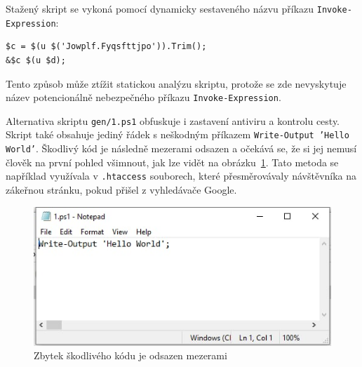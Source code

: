 \documentclass[12pt,a4paper]{article}
\begin{document}
Stažený skript se vykoná pomocí dynamicky sestaveného názvu příkazu \texttt{Invoke-Expression}:
\begin{verbatim}
$c = $(u $('Jowplf.Fyqsfttjpo')).Trim();
&$c $(u $d);
\end{verbatim}
Tento způsob může ztížit statickou analýzu skriptu, protože se zde nevyskytuje název potencionálně nebezpečného příkazu \texttt{Invoke-Expression}.


Alternativa skriptu \texttt{gen/1.ps1} obfuskuje i zastavení antiviru a kontrolu cesty.
Skript také obsahuje jediný řádek s neškodným příkazem \texttt{Write-Output 'Hello World'}.
Škodlivý kód je následně mezerami odsazen a očekává se, že si jej nemusí člověk na první pohled všimnout, jak lze vidět na obrázku~\ref{fig:notepad}. 
Tato metoda se například využívala v \texttt{.htaccess} souborech, které přesměrovávaly návštěvníka na zákeřnou stránku, pokud přišel z vyhledávače Google.

\begin{figure}[ht]
	\includegraphics[width=\linewidth]{notepad}
	\caption{Zbytek škodlivého kódu je odsazen mezerami}
	\label{fig:notepad}
\end{figure}
\end{document}
